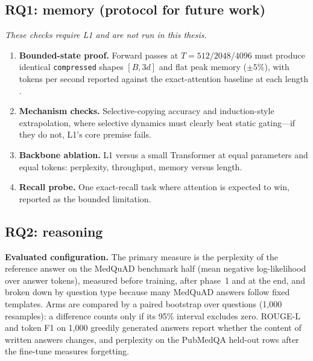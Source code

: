 \documentclass[11pt,a4paper]{article}
\theoremstyle{plain}
\theoremstyle{definition}
\theoremstyle{remark}
\begin{document}
\subsection{RQ1: memory (protocol for future work)}
\label{sec:rq1}

\noindent
\emph{These checks require L1 and are not run in this thesis.}

\begin{enumerate}
  \item \textbf{Bounded-state proof.} Forward passes at
    $T = 512 / 2048 / 4096$ must produce identical \texttt{compressed} shapes
    $[B, 3d]$ and flat peak memory ($\pm5\%$), with tokens per second reported
    against the exact-attention baseline at each length \cite{dao2022flashattn}.
  \item \textbf{Mechanism checks.} Selective-copying accuracy and
    induction-style extrapolation, where selective dynamics must clearly beat
    static gating---if they do not, L1's core premise fails.
  \item \textbf{Backbone ablation.} L1 versus a small Transformer at equal
    parameters and equal tokens: perplexity, throughput, memory versus length.
  \item \textbf{Recall probe.} One exact-recall task where attention is
    expected to win, reported as the bounded limitation.
\end{enumerate}

\subsection{RQ2: reasoning}

\noindent
\textbf{Evaluated configuration.} The primary measure is the perplexity of
the reference answer on the MedQuAD benchmark half (mean negative
log-likelihood over answer tokens), measured before training, after phase~1
and at the end, and broken down by question type because many MedQuAD answers
follow fixed templates. Arms are compared by a paired bootstrap
\cite{koehn2004bootstrap} over questions (1{,}000 resamples): a difference
counts only if its 95\% interval excludes zero. ROUGE-L \cite{lin2004rouge}
and token F1 on 1{,}000 greedily generated answers report whether the content
of written answers changes, and perplexity on the PubMedQA held-out rows after
the fine-tune measures forgetting.
\end{document}
